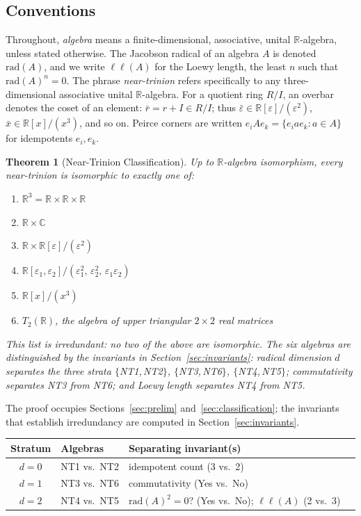 \documentclass{amsart}
\theoremstyle{plain}
\newtheorem{theorem}{Theorem}[section]
\theoremstyle{definition}
\theoremstyle{remark}
\newcommand{\RR}{\mathbb{R}}
\newcommand{\CC}{\mathbb{C}}
\newcommand{\Jac}{\mathrm{rad}}
\newcommand{\LL}{\ell\ell}
\begin{document}
\subsection{Conventions}

Throughout, \emph{algebra} means a finite-dimensional, associative,
unital $\RR$-algebra, unless stated otherwise.
The Jacobson radical of an algebra $A$ is denoted $\Jac(A)$, and we write
$\LL(A)$ for the Loewy length, the least $n$ such that $\Jac(A)^n = 0$.
The phrase \emph{near-trinion} refers specifically to
any three-dimensional associative unital $\RR$-algebra.
For a quotient ring $R/I$, an overbar denotes the coset of an element:
$\bar{r} = r + I \in R/I$; thus $\bar\varepsilon \in \RR[\varepsilon]/(\varepsilon^2)$,
$\bar x \in \RR[x]/(x^3)$, and so on.
Peirce corners are written $e_i A e_k = \{e_i a e_k : a \in A\}$
for idempotents $e_i, e_k$. 

\bigskip

\begin{theorem}[Near-Trinion Classification]\label{thm:main}
  Up to $\RR$-algebra isomorphism, every near-trinion is isomorphic to
  exactly one of:
  \begin{enumerate}[label=\textup{(NT\arabic*)}]
    \item $\RR^3 = \RR \times \RR \times \RR$
    \item $\RR \times \CC$
    \item $\RR \times \RR[\varepsilon]/(\varepsilon^2)$
    \item $\RR[\varepsilon_1, \varepsilon_2]/
          (\varepsilon_1^2,\, \varepsilon_2^2,\, \varepsilon_1\varepsilon_2)$
    \item $\RR[x]/(x^3)$
    \item $T_2(\RR)$, the algebra of upper triangular $2\times 2$ real matrices
  \end{enumerate}
  This list is irredundant: no two of the above are isomorphic.
  The six algebras are distinguished by the invariants in
  Section~\ref{sec:invariants}: radical dimension $d$ separates the
  three strata $\{$NT1,\,NT2$\}$, $\{$NT3,\,NT6$\}$, $\{$NT4,\,NT5$\}$;
  commutativity separates NT3 from NT6; and Loewy length separates
  NT4 from NT5.
\end{theorem}

The proof occupies Sections~\ref{sec:prelim} and~\ref{sec:classification};
the invariants that establish irredundancy are computed in
Section~\ref{sec:invariants}.

\begin{center}
\renewcommand{\arraystretch}{1.25}
\begin{tabular}{clll}
  \toprule
  Stratum & Algebras & Separating invariant(s) \\
  \midrule
  $d=0$ & NT1 vs.\ NT2 & idempotent count (3 vs.\ 2) \\
  $d=1$ & NT3 vs.\ NT6 & commutativity (Yes vs.\ No) \\
  $d=2$ & NT4 vs.\ NT5 & $\Jac(A)^2=0$? (Yes vs.\ No); $\LL(A)$ (2 vs.\ 3) \\
  \bottomrule
\end{tabular}
\end{center}
\end{document}
